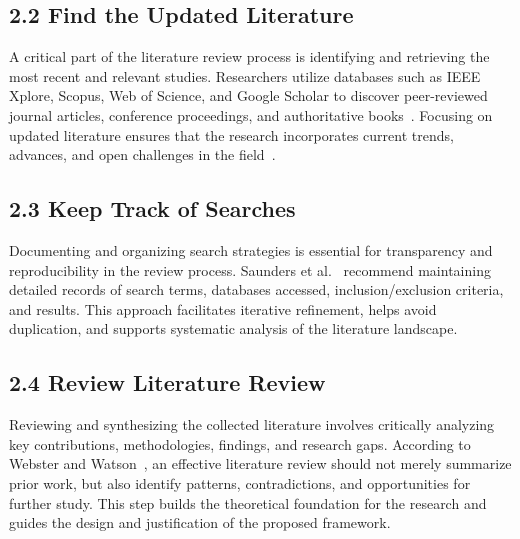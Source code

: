 \subsection{2.2 Find the Updated Literature}

A critical part of the literature review process is identifying and retrieving the most recent and relevant studies. Researchers utilize databases such as IEEE Xplore, Scopus, Web of Science, and Google Scholar to discover peer-reviewed journal articles, conference proceedings, and authoritative books~\cite{booth2021systematic}. Focusing on updated literature ensures that the research incorporates current trends, advances, and open challenges in the field~\cite{okoli2010guide}.

\subsection{2.3 Keep Track of Searches}

Documenting and organizing search strategies is essential for transparency and reproducibility in the review process. Saunders et al.~\cite{saunders2019researchmethods} recommend maintaining detailed records of search terms, databases accessed, inclusion/exclusion criteria, and results. This approach facilitates iterative refinement, helps avoid duplication, and supports systematic analysis of the literature landscape.

\subsection{2.4 Review Literature Review}

Reviewing and synthesizing the collected literature involves critically analyzing key contributions, methodologies, findings, and research gaps. According to Webster and Watson~\cite{webster2002analyzing}, an effective literature review should not merely summarize prior work, but also identify patterns, contradictions, and opportunities for further study. This step builds the theoretical foundation for the research and guides the design and justification of the proposed framework.



